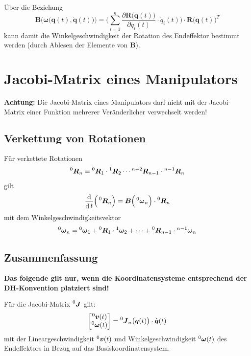 \documentclass[a4paper, 11pt, accentcolor = tud3b]{tudreport}
\DeclareMathOperator{\total}{d}
\newcommand{\inreferenceto}[2]{\prescript{#1}{}{#2}}
\newcommand{\mat}[1]{\boldsymbol{#1}}
\renewcommand{\vec}[1]{\boldsymbol{#1}}
\begin{document}
			Über die Beziehung
			\begin{equation*}
				\mat{B}\Big(\!\vec{\omega}\big(\vec{q}(t), \dot{\vec{q}}(t)\big)\!\Big) = \Bigg( \sum_{i = 1}^{n} \frac{\partial \mat{R}\big(\vec{q}(t)\big)}{\partial q_i(t)} \cdot \dot{q}_i(t) \!\Bigg) \cdot \mat{R}\big(\vec{q}(t)\big)^T
			\end{equation*}
			kann damit die Winkelgeschwindigkeit der Rotation des Endeffektor bestimmt werden (durch Ablesen der Elemente von \(\mat{B}\)).

		\section{Jacobi-Matrix eines Manipulators}
			\textbf{Achtung:} Die Jacobi-Matrix eines Manipulators darf nicht mit der Jacobi-Matrix einer Funktion mehrerer Veränderlicher verwechselt werden!
			
			\subsection{Verkettung von Rotationen}
				Für verkettete Rotationen
				\begin{equation*}
					\inreferenceto{0}{\mat{R}}_n = \inreferenceto{0}{\mat{R}}_1 \cdot \inreferenceto{1}{\mat{R}}_2 \cdots \inreferenceto{n - 2}{\mat{R}}_{n - 1} \cdot \inreferenceto{n - 1}{\mat{R}}_n
				\end{equation*}
				gilt
				\begin{equation*}
					\frac{\total}{\total t} \Big( \inreferenceto{0}{\mat{R}}_n \Big) = \mat{B}\Big(\inreferenceto{0}{\vec{\omega}}_n\Big) \cdot \inreferenceto{0}{\mat{R}}_n
				\end{equation*}
				mit dem Winkelgeschwindigkeitsvektor
				\begin{equation*}
					\inreferenceto{0}{\vec{\omega}}_n = \inreferenceto{0}{\vec{\omega}}_1 + \inreferenceto{0}{\mat{R}}_1 \cdot \inreferenceto{1}{\vec{\omega}}_2 + \cdots + \inreferenceto{0}{\mat{R}}_{n - 1} \cdot \inreferenceto{n - 1}{\vec{\omega}}_n
				\end{equation*}

			\subsection{Zusammenfassung}
				\textbf{Das folgende gilt nur, wenn die Koordinatensysteme entsprechend der DH-Konvention platziert sind!}
			
				Für die Jacobi-Matrix \( \inreferenceto{0}{\mat{J}} \) gilt:
				\begin{equation*}
					\begin{bmatrix}
						\inreferenceto{0}{\vec{v}}(t) \\
						\inreferenceto{0}{\vec{\omega}}(t)
					\end{bmatrix}
					=
					\inreferenceto{0}{\mat{J}}_n\big(\vec{q}(t)\big) \cdot \dot{\vec{q}}(t)
				\end{equation*}
				mit der Lineargeschwindigkeit \( \inreferenceto{0}{\vec{v}}(t) \) und Winkelgeschwindigkeit \( \inreferenceto{0}{\vec{\omega}}(t) \) des Endeffektors in Bezug auf das Basiskoordinatensystem.
				
\end{document}
